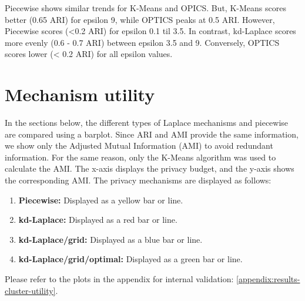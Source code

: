 Piecewise shows similar trends for K-Means and OPICS. But, K-Means scores better (0.65 ARI) for epsilon 9, while OPTICS peaks at 0.5 ARI.
However, Piecewise scores (<0.2 ARI) for epsilon 0.1 til 3.5.
In contrast, kd-Laplace scores more evenly (0.6 - 0.7 ARI) between epsilon 3.5 and 9. Conversely, OPTICS scores lower (< 0.2 ARI) for all epsilon values.
\section{Mechanism utility}
In the sections below, the different types of Laplace mechanisms and piecewise are compared using a barplot.
Since ARI and AMI provide the same information, we show only the Adjusted Mutual Information (AMI) to avoid redundant information.
For the same reason, only the K-Means algorithm was used to calculate the AMI.
The x-axis displays the privacy budget, and the y-axis shows the corresponding AMI.
The privacy mechanisms are displayed as follows:
\begin{enumerate}
    \item \textbf{Piecewise:} Displayed as a yellow bar or line.
    \item \textbf{kd-Laplace:} Displayed as a red bar or line.
    \item \textbf{kd-Laplace/grid:} Displayed as a blue bar or line.
    \item \textbf{kd-Laplace/grid/optimal:} Displayed as a green bar or line.
\end{enumerate}

Please refer to the plots in the appendix for internal validation: \ref{appendix:results-cluster-utility}.
\newpage
